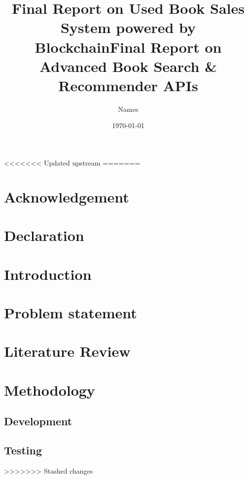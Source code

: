 \documentclass{article}
\title{Final Report on Used Book Sales System powered by Blockchain}
\title{Final Report on Advanced Book Search \& Recommender APIs}
\author{Names}
\date{\today}
\begin{document}
\maketitle

\begin{abstract}
    
\end{abstract}

<<<<<<< Updated upstream
=======
\newpage

\section*{Acknowledgement}
    
\newpage

\section*{Declaration}
    
\newpage

\tableofcontents
\newpage

\section{Introduction}
    

\section{Problem statement}
    

\section{Literature Review}
    

\section{Methodology}
    

\subsection{Development}
    

\subsection{Testing}
    

>>>>>>> Stashed changes
\end{document}
